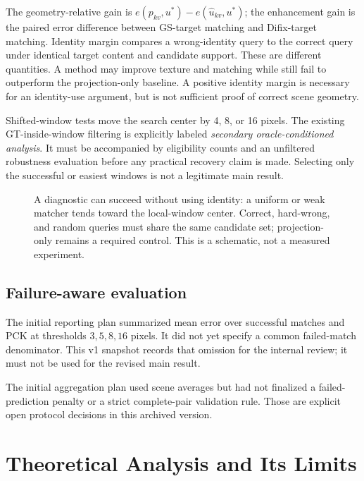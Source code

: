 \documentclass[10pt,twocolumn,letterpaper]{article}
\begin{document}
The geometry-relative gain is $e(p_{kv},u^*)-e(\widehat u_{kv},u^*)$; the enhancement gain is the paired error difference between GS-target matching and Difix-target matching. Identity margin compares a wrong-identity query to the correct query under identical target content and candidate support. These are different quantities. A method may improve texture and matching while still fail to outperform the projection-only baseline. A positive identity margin is necessary for an identity-use argument, but is not sufficient proof of correct scene geometry.

Shifted-window tests move the search center by 4, 8, or 16 pixels. The existing GT-inside-window filtering is explicitly labeled \emph{secondary oracle-conditioned analysis}. It must be accompanied by eligibility counts and an unfiltered robustness evaluation before any practical recovery claim is made. Selecting only the successful or easiest windows is not a legitimate main result.

\begin{figure}[t]
\centering
\caption{A diagnostic can succeed without using identity: a uniform or weak matcher tends toward the local-window center. Correct, hard-wrong, and random queries must share the same candidate set; projection-only remains a required control. This is a schematic, not a measured experiment.}
\label{fig:null}
\end{figure}

\subsection{Failure-aware evaluation}
The initial reporting plan summarized mean error over successful matches and PCK at thresholds $3,5,8,16$ pixels. It did not yet specify a common failed-match denominator. This v1 snapshot records that omission for the internal review; it must not be used for the revised main result.

The initial aggregation plan used scene averages but had not finalized a failed-prediction penalty or a strict complete-pair validation rule. Those are explicit open protocol decisions in this archived version.

\section{Theoretical Analysis and Its Limits}
\end{document}
